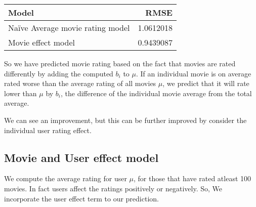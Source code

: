 \documentclass[
]{article}
\newenvironment{Shaded}{\begin{snugshade}}{\end{snugshade}}
\newcommand{\CommentTok}[1]{\textcolor[rgb]{0.00,0.40,1.00}{\textbf{\textit{#1}}}}
\newcommand{\DataTypeTok}[1]{\textcolor[rgb]{0.74,0.68,0.62}{\underline{#1}}}
\newcommand{\KeywordTok}[1]{\textcolor[rgb]{0.26,0.66,0.93}{\textbf{#1}}}
\newcommand{\NormalTok}[1]{\textcolor[rgb]{0.74,0.68,0.62}{#1}}
\newcommand{\OperatorTok}[1]{\textcolor[rgb]{0.74,0.68,0.62}{#1}}
\newcommand{\StringTok}[1]{\textcolor[rgb]{0.02,0.61,0.04}{#1}}
\begin{document}
\begin{Shaded}
\end{Shaded}

\begin{longtable}[]{@{}lr@{}}
\toprule
Model & RMSE\tabularnewline
\midrule
\endhead
Naïve Average movie rating model & 1.0612018\tabularnewline
Movie effect model & 0.9439087\tabularnewline
\bottomrule
\end{longtable}

So we have predicted movie rating based on the fact that movies are
rated differently by adding the computed \(b_{i}\) to \(\mu\). If an
individual movie is on average rated worse than the average rating of
all movies \(\mu\), we predict that it will rate lower than \(\mu\) by
\(b_{i}\), the difference of the individual movie average from the total
average.

We can see an improvement, but this can be further improved by consider
the individual user rating effect.

\pagebreak

\hypertarget{movie-and-user-effect-model}{%
\subsection{Movie and User effect
model}\label{movie-and-user-effect-model}}

We compute the average rating for user \(\mu\), for those that have
rated atleast 100 movies. In fact users affect the ratings positively or
negatively. So, We incorporate the user effect term to our prediction.
\end{document}
